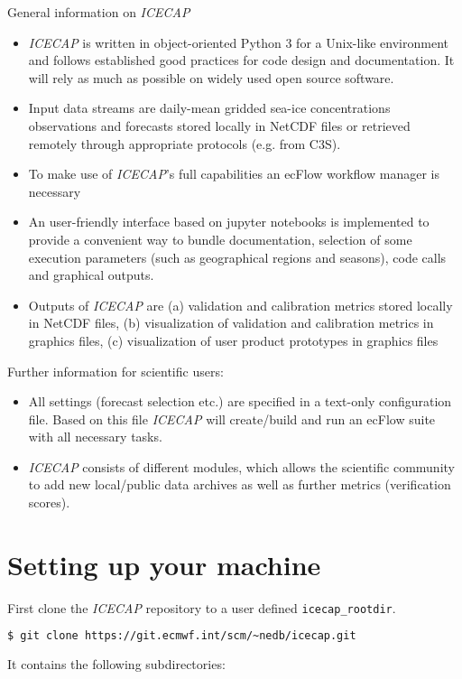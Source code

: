 \documentclass[DIV=10, parskip=full]{scrreprt}
\newcommand{\ice}{\textit{ICECAP}\xspace}
\begin{document}
General information on \ice
\begin{itemize}
	\item \ice is written in object-oriented Python 3 for a Unix-like environment and follows established good practices for code design and documentation. It will rely as much as possible on widely used open source software.
	\item Input data streams are daily-mean gridded sea-ice concentrations observations and forecasts stored locally in NetCDF files or retrieved remotely through appropriate protocols (e.g. from C3S).
	\item To make use of \ice's full capabilities an ecFlow workflow manager is necessary
	\item An user-friendly interface based on jupyter notebooks is implemented to provide a convenient way to bundle documentation, selection of some execution parameters (such as geographical regions and seasons), code calls and graphical outputs. 
	\item Outputs of \ice are (a) validation and calibration metrics stored locally in NetCDF files, (b) visualization of validation and calibration metrics in graphics files, (c) visualization of user product prototypes in graphics files
\end{itemize}

Further information for scientific users:
\begin{itemize}
	\item All settings (forecast selection etc.) are specified in a text-only configuration file. Based on this file \ice will create/build and run an ecFlow suite  with all necessary tasks.
	\item \ice consists of different modules, which allows the scientific community to add new local/public data archives as well as further metrics (verification scores).
\end{itemize}



\FloatBarrier
\section{Setting up your machine}\label{sec:setup}
First clone the \ice repository to a user defined \texttt{icecap\_rootdir}.
\begin{lstlisting}[language=bash]
	$ git clone https://git.ecmwf.int/scm/~nedb/icecap.git
\end{lstlisting}


It contains the following subdirectories:
\end{document}

